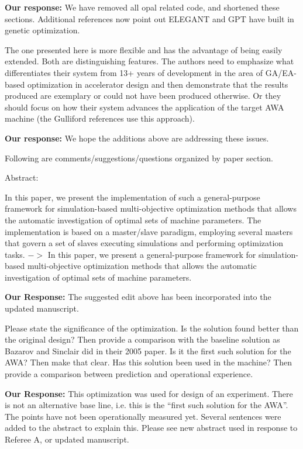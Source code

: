 \documentclass{article}
\begin{document}
{\bf Our response: }{\color{blue} We have removed all opal related code, and shortened these sections.
	Additional references now point out ELEGANT and GPT have built in genetic optimization.}

The one presented here is more
flexible and has the advantage of being easily extended. Both are
distinguishing features. The authors need to emphasize what
differentiates their system from 13+ years of development in the area
of GA/EA-based optimization in accelerator design and then demonstrate
that the results produced are exemplary or could not have been
produced otherwise. Or they should focus on how their system advances
the application of the target AWA machine (the Gulliford references
use this approach).

{\bf Our response: }{\color{blue} 	
	We hope the additions above are addressing these issues. }

Following are comments/suggestions/questions organized by paper
section.

Abstract:

In this paper, we present the implementation of such a general-purpose
framework for simulation-based multi-objective optimization methods
that allows the automatic investigation of optimal sets of machine
parameters. The implementation is based on a master/slave paradigm,
employing several masters that govern a set of slaves executing
simulations and performing optimization tasks. $->$ In this paper, we
present a general-purpose framework for simulation-based
multi-objective optimization methods that allows the automatic
investigation of optimal sets of machine parameters.

{\bf Our Response:} {\color{blue} The suggested edit above has been incorporated into the updated manuscript. }

Please state
the significance of the optimization. Is the solution found better
than the original design? Then provide a comparison with the baseline
solution as Bazarov and Sinclair did in their 2005 paper. Is it the
first such solution for the AWA? Then make that clear. Has this
solution been used in the machine? Then provide a comparison between
prediction and operational experience.

{\bf Our Response:} {\color{blue} This optimization was used for design of 
an experiment. There is not an alternative base line, i.e. this is the 
``first such solution for the AWA''. The points have not been operationally measured yet.
Several sentences were added to the abstract to explain this. 
Please see new abstract used in response to Referee A, or updated manuscript.
}
\end{document}
